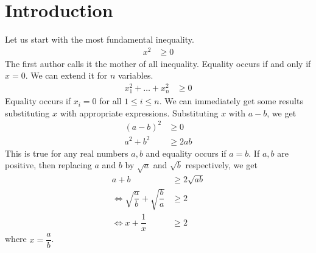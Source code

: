 \documentclass{subfile}
\begin{document}
	\section{Introduction}\label{sec:intro}%
	Let us start with the most fundamental inequality.
		\begin{align}
			x^2
				& \geq0\label{eqn:mother}
		\end{align}
	The first author calls it the mother of all inequality. Equality occurs if and only if $x=0$. We can extend it for $n$ variables.
		\begin{align}
			x_1^2+\ldots+x_n^2
				& \geq0\label{eqn:extendedmother}
		\end{align}
	Equality occurs if $x_i=0$ for all $1\leq i\leq n$. We can immediately get some results substituting $x$ with appropriate expressions. Substituting $x$ with $a-b$, we get
		\begin{align*}
			(a-b)^2
				& \geq0\\
			a^2+b^2
				& \geq2ab
		\end{align*}
	This is true for any real numbers $a,b$ and equality occurs if $a=b$. If $a,b$ are positive, then replacing $a$ and $b$ by $\sqrt{a}$ and $\sqrt{b}$ respectively, we get
		\begin{align*}
			a+b
				& \geq2\sqrt{ab}\\
			\iff\sqrt{\dfrac{a}{b}}+\sqrt{\dfrac{b}{a}}
				& \geq2\\
			\iff x+\dfrac{1}{x}
				& \geq2
		\end{align*}
	where $x=\dfrac{a}{b}$.
	
\end{document}
